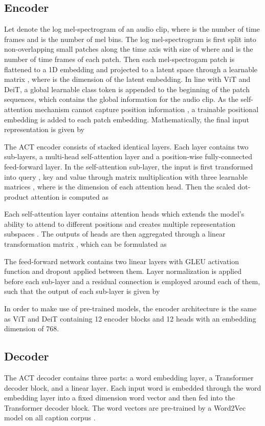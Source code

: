 \documentclass{article}
\begin{document}
\begin{sloppy}
\subsection{Encoder}
\label{ssec:encoder}
Let  denote the log mel-spectrogram of an audio clip, where  is the number of time frames and  is the number of mel bins. The log mel-spectrogram is first split into  non-overlapping small patches  along the time axis with size of  where  and  is the number of time frames of each patch. Then each mel-spectrogam patch is flattened to a 1D embedding and projected to a latent space through a learnable matrix , where  is the dimension of the latent embedding. In line with ViT and DeiT, a global learnable class token  is appended to the beginning of the patch sequences, which contains the global information for the audio clip. As the self-attention mechanism cannot capture position information \cite{vaswani2017attention}, a trainable positional embedding  is added to each patch embedding. Mathematically, the final input representation is given by


The ACT encoder consists of  stacked identical layers. Each layer contains two sub-layers, a multi-head self-attention layer and a position-wise fully-connected feed-forward layer. In the self-attention sub-layer, the input is first transformed into query , key  and value  through matrix multiplication with three learnable matrices , where  is the dimension of each attention head. Then the scaled dot-product attention is computed as 

Each self-attention layer contains  attention heads which extends the model's ability to attend to different positions and creates multiple representation subspaces \cite{vaswani2017attention}. The outputs of heads are then aggregated through a linear transformation matrix , which can be formulated as


The feed-forward network contains two linear layers with GLEU activation function and dropout applied between them. Layer normalization is applied before each sub-layer and a residual connection is employed around each of them, such that the output of each sub-layer is given by

In order to make use of pre-trained models, the encoder architecture is the same as ViT and DeiT containing \num{12} encoder blocks and \num{12} heads with an embedding dimension of \num{768}.

\subsection{Decoder}
\label{ssec:decoder}
The ACT decoder contains three parts: a word embedding layer, a Transformer decoder block, and a linear layer. Each input word is embedded through the word embedding layer into a fixed dimension word vector and then fed into the Transformer decoder block. The word vectors are pre-trained by a Word2Vec model on all caption corpus \cite{mikolov2013efficient}.


\end{sloppy}
\end{document}
